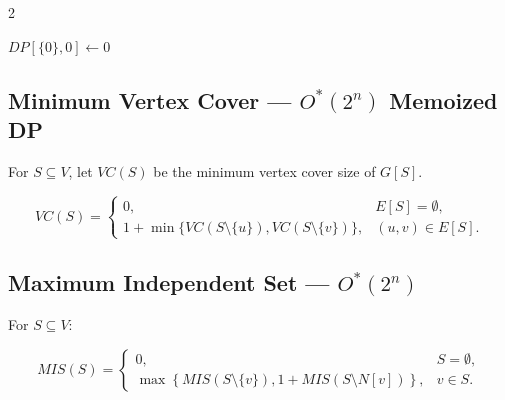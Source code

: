 \documentclass[8pt]{extarticle}
\theoremstyle{definition}
\begin{document}
\begin{multicols*}{2}
\begin{algorithm}[H]
\DontPrintSemicolon
{}
$DP[\{0\},0]\gets0$\;
\;
\end{algorithm}


\subsection{Minimum Vertex Cover --- $O^*(2^n)$ Memoized DP}

For $S\subseteq V$, let $VC(S)$ be the minimum vertex
cover size of $G[S]$.

\[
VC(S)=
\begin{cases}
0, & E[S]=\emptyset,\\[2mm]
1+\min\{VC(S\setminus\{u\}),
        VC(S\setminus\{v\})\},
& (u,v)\in E[S].
\end{cases}
\]

\begin{algorithm}[H]
\DontPrintSemicolon
{}
\end{algorithm}


\subsection{Maximum Independent Set --- $O^*(2^n)$}

For $S\subseteq V$:

\[
MIS(S)=
\begin{cases}
0,&S=\emptyset,\\[1mm]
\max\left\{
MIS(S\setminus\{v\}),
1+MIS(S\setminus N[v])
\right\},
&v\in S.
\end{cases}
\]

\begin{algorithm}[H]
\DontPrintSemicolon
{}
\end{algorithm}


\end{multicols*}
\end{document}

